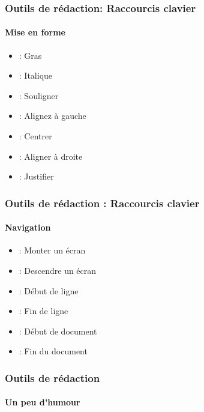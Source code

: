 \documentclass[xcolor=table]{beamer}
\begin{document}
\begin{frame}
\frametitle{Outils de rédaction: Raccourcis clavier}
\framesubtitle{Mise en forme}

\begin{itemize}
	\item {} : Gras
	\item {} : Italique
	\item {} : Souligner
	\item {} : Alignez à gauche
	\item {} : Centrer
	\item {} : Aligner à droite
	\item {} : Justifier 
\end{itemize}

\end{frame}

\begin{frame}
\frametitle{Outils de rédaction : Raccourcis clavier}
\framesubtitle{Navigation}

\begin{itemize}
	\item {} : Monter un écran
	\item {} : Descendre un écran
	\item {} : Début de ligne
	\item {} : Fin de ligne
	\item {} : Début de document
	\item {} : Fin du document 
\end{itemize}

\end{frame}

\begin{frame}
\frametitle{Outils de rédaction}
\framesubtitle{Un peu d'humour}

\begin{center}
\end{center}

\end{frame}

\end{document}
